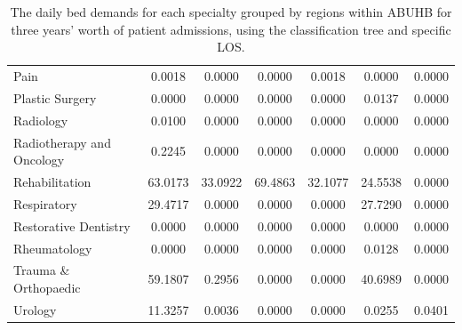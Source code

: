 \documentclass[thesis.tex]{subfiles}
\begin{document}
\begin{table}[h!]
{\begin{tabular}{lcccccc}
Pain&	0.0018&	0.0000&	0.0000&	0.0018&	0.0000&	0.0000\\
Plastic Surgery&	0.0000&	0.0000&	0.0000&	0.0000&	0.0137&	0.0000\\
Radiology&	0.0100&	0.0000&	0.0000&	0.0000&	0.0000&	0.0000\\
Radiotherapy and Oncology&	0.2245&	0.0000&	0.0000&	0.0000&	0.0000&	0.0000\\
Rehabilitation&	63.0173&	33.0922&	69.4863&	32.1077&	24.5538&	0.0000\\
Respiratory&	29.4717&	0.0000&	0.0000&	0.0000&	27.7290&	0.0000\\
Restorative Dentistry&	0.0000&	0.0000&	0.0000&	0.0000&	0.0000&	0.0000\\
Rheumatology&	0.0000&	0.0000&	0.0000&	0.0000&	0.0128&	0.0000\\
Trauma \& Orthopaedic&	59.1807&	0.2956&	0.0000&	0.0000&	40.6989&	0.0000\\
Urology&	11.3257&	0.0036&	0.0000&	0.0000&	0.0255&	0.0401\\


\bottomrule

    \end{tabular}}
    \caption{The daily bed demands for each specialty grouped by regions within ABUHB for three years’ worth of patient admissions, using the classification tree and specific LOS.}
    \label{apptab:LinkedDemands9}
\end{table}
\end{document}
